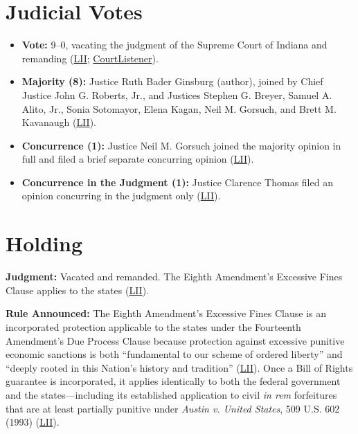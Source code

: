\documentclass[12pt]{article}
\begin{document}
\section{Judicial Votes}

\begin{itemize}
  \item \textbf{Vote:} 9--0, vacating the judgment of the Supreme Court of Indiana and remanding (\href{https://www.law.cornell.edu/supremecourt/text/17-1091}{LII}; \href{https://www.courtlistener.com/opinion/4591916/timbs-v-indiana/}{CourtListener}).
  \item \textbf{Majority (8):} Justice Ruth Bader Ginsburg (author), joined by Chief Justice John G. Roberts, Jr., and Justices Stephen G. Breyer, Samuel A. Alito, Jr., Sonia Sotomayor, Elena Kagan, Neil M. Gorsuch, and Brett M. Kavanaugh (\href{https://www.law.cornell.edu/supremecourt/text/17-1091}{LII}).
  \item \textbf{Concurrence (1):} Justice Neil M. Gorsuch joined the majority opinion in full and filed a brief separate concurring opinion (\href{https://www.law.cornell.edu/supremecourt/text/17-1091}{LII}).
  \item \textbf{Concurrence in the Judgment (1):} Justice Clarence Thomas filed an opinion concurring in the judgment only (\href{https://www.law.cornell.edu/supremecourt/text/17-1091}{LII}).
\end{itemize}

\section{Holding}

\textbf{Judgment:} Vacated and remanded. The Eighth Amendment's Excessive Fines Clause applies to the states (\href{https://www.law.cornell.edu/supremecourt/text/17-1091}{LII}).

\textbf{Rule Announced:} The Eighth Amendment's Excessive Fines Clause is an incorporated protection applicable to the states under the Fourteenth Amendment's Due Process Clause because protection against excessive punitive economic sanctions is both ``fundamental to our scheme of ordered liberty'' and ``deeply rooted in this Nation's history and tradition'' (\href{https://www.law.cornell.edu/supremecourt/text/17-1091}{LII}). Once a Bill of Rights guarantee is incorporated, it applies identically to both the federal government and the states---including its established application to civil \textit{in rem} forfeitures that are at least partially punitive under \textit{Austin v. United States}, 509 U.S. 602 (1993) (\href{https://www.law.cornell.edu/supremecourt/text/17-1091}{LII}).
\end{document}
